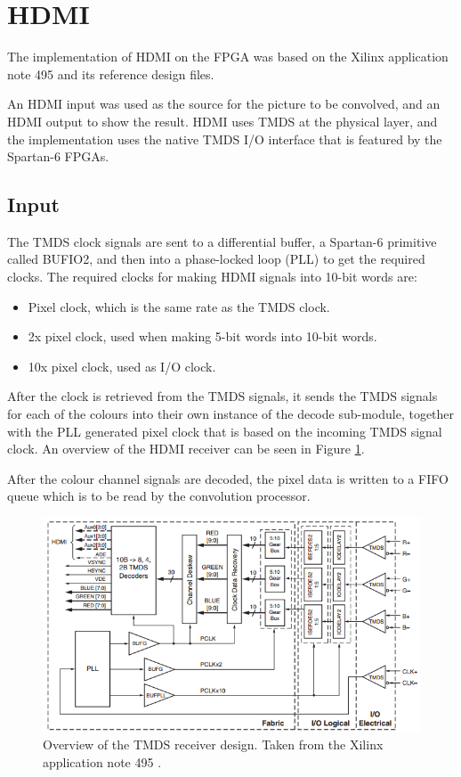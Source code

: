 \section{HDMI}
The implementation of HDMI on the FPGA was based on the Xilinx application note 495 \cite{xapp495} and its reference design files.

An HDMI input was used as the source for the picture to be convolved, and an HDMI output to show the result.
HDMI uses TMDS at the physical layer, and the implementation uses the native TMDS I/O interface that is featured by the Spartan-6 FPGAs.

\subsection{Input}
The TMDS clock signals are sent to a differential buffer, a Spartan-6 primitive called BUFIO2, and then into a phase-locked loop (PLL) to get the required clocks. The required clocks for making HDMI signals into 10-bit words are:
\begin{itemize}
    \item   Pixel clock, which is the same rate as the TMDS clock.
    \item   2x pixel clock, used when making 5-bit words into 10-bit words.
    \item   10x pixel clock, used as I/O clock.
\end{itemize}

After the clock is retrieved from the TMDS signals, it sends the TMDS signals for each of the colours into their own instance of the decode sub-module, together with the PLL generated pixel clock that is based on the incoming TMDS signal clock.
An overview of the HDMI receiver can be seen in Figure \ref{fig:TMDSReceiver}.

After the colour channel signals are decoded, the pixel data is written to a FIFO queue which is to be read by the convolution processor.

\begin{figure}[h!]
    \centering
    \includegraphics[width=\linewidth]{img/TMDSreceiverdesign.png}
    \caption[Overview of the TMDS receiver design.]{Overview of the TMDS receiver design. Taken from the Xilinx application note 495 \cite{xapp495}.}
    \label{fig:TMDSReceiver}
\end{figure}


